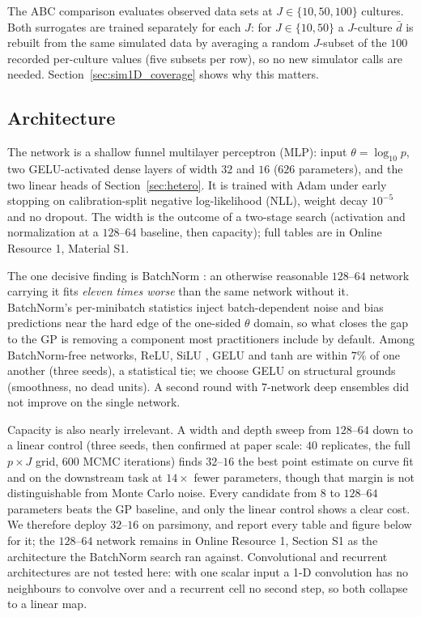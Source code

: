 \documentclass[sn-basic,iicol,pdflatex]{sn-jnl}
\newcommand{\dbar}{\ensuremath{\bar d}}
\begin{document}
The ABC comparison evaluates observed data sets at $J \in \{10, 50, 100\}$
cultures. Both surrogates are trained separately for each $J$: for $J \in
\{10, 50\}$ a $J$-culture $\dbar$ is rebuilt from the same simulated data by
averaging a random $J$-subset of the $100$ recorded per-culture values (five
subsets per row), so no new simulator calls are needed.
Section~\ref{sec:sim1D_coverage} shows why this matters.

\subsection{Architecture}
\label{sec:arch1D}

The network is a shallow funnel multilayer perceptron (MLP): input $\theta=\log_{10}p$, two
GELU-activated dense layers of width $32$ and $16$ ($626$ parameters), and the
two linear heads of Section~\ref{sec:hetero}. It is trained with Adam under
early stopping on calibration-split negative log-likelihood (NLL), weight decay $10^{-5}$ and no dropout.
The width is the outcome of a two-stage search (activation and normalization at
a $128$--$64$ baseline, then capacity); full tables are in Online Resource 1,
Material S1.

The one decisive finding is BatchNorm \citep{ioffe2015}: an otherwise reasonable
$128$--$64$ network carrying it fits \emph{eleven times worse} than the same
network without it. BatchNorm's per-minibatch statistics inject batch-dependent
noise and bias predictions near the hard edge of the one-sided $\theta$ domain,
so what closes the gap to the GP is removing a component most practitioners
include by default. Among BatchNorm-free networks, ReLU, SiLU
\citep{elfwing2018}, GELU and tanh are within $7\%$ of one
another (three seeds), a statistical tie; we choose GELU on structural grounds
(smoothness, no dead units). A second round with $7$-network deep ensembles did
not improve on the single network.

Capacity is also nearly irrelevant. A width and depth sweep from $128$--$64$ down
to a linear control (three seeds, then confirmed at paper scale: $40$ replicates,
the full $p\times J$ grid, $600$ MCMC iterations) finds $32$--$16$ the best point
estimate on curve fit and on the downstream task at $14\times$ fewer parameters,
though that margin is not distinguishable from Monte Carlo noise. Every candidate
from $8$ to $128$--$64$ parameters beats the GP baseline, and only the linear
control shows a clear cost. We therefore deploy $32$--$16$ on parsimony, and
report every table and figure below for it; the $128$--$64$ network remains in
Online Resource 1, Section S1 as the architecture the BatchNorm search ran against.
Convolutional and recurrent architectures are not tested here: with one scalar
input a 1-D convolution has no neighbours to convolve over and a recurrent cell
no second step, so both collapse to a linear map.
\end{document}
